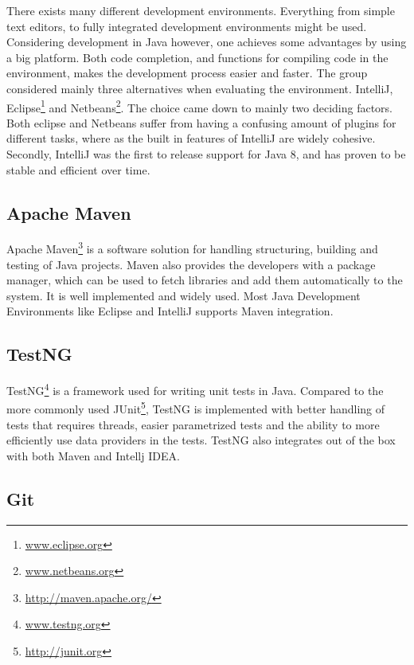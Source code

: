 There exists many different development environments. Everything from simple text editors, to fully integrated development environments might be used. Considering development in Java however, one achieves some advantages by using a big platform. Both code completion, and functions for compiling code in the environment, makes the development process easier and faster. The group considered mainly three alternatives when evaluating the environment. IntelliJ, Eclipse\footnote{\url{www.eclipse.org}} and Netbeans\footnote{\url{www.netbeans.org}}. The choice came down to mainly two deciding factors. Both eclipse and Netbeans suffer from having a confusing amount of plugins for different tasks, where as the built in features of IntelliJ are widely cohesive. Secondly, IntelliJ was the first to release support for Java 8, and has proven to be stable and efficient over time.

\subsection{Apache Maven}
\label{subsec:prestudies-tools-apache_maven}

Apache Maven\footnote{\url{http://maven.apache.org/}} is a software solution for handling structuring, building and testing of Java projects. Maven also provides the developers with a package manager, which can be used to fetch libraries and add them automatically to the system. It is well implemented and widely used. Most Java Development Environments like Eclipse and IntelliJ supports Maven integration.

\subsection{TestNG}
\label{subsec:prestudies-tools-testng}

TestNG\footnote{\url{www.testng.org}} is a framework used for writing unit tests in Java. Compared to the more commonly used JUnit\footnote{\url{http://junit.org}}, TestNG is implemented with better handling of tests that requires threads, easier parametrized tests and the ability to more efficiently use data providers in the tests. TestNG also integrates out of the box with both Maven and Intellj IDEA.

\subsection{Git}
\label{subsec:prestudies-tools-git}

